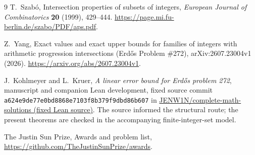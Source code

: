 \documentclass[11pt,a4paper]{article}
\theoremstyle{definition}\newtheorem{definition}[theorem]{Definition}
\begin{document}
\begin{thebibliography}{9}
T.~Szab\'o, Intersection properties of subsets of integers,
\emph{European Journal of Combinatorics} \textbf{20} (1999), 429--444.
\url{https://page.mi.fu-berlin.de/szabo/PDF/aps.pdf}.

Z.~Yang, Exact values and exact upper bounds for families of integers with
arithmetic progression intersections (Erd\H{o}s Problem \#272),
arXiv:2607.23004v1 (2026).
\url{https://arxiv.org/abs/2607.23004v1}.

J.~Kohlmeyer and L.~Kruer, \emph{A linear error bound for Erd\H{o}s problem 272},
manuscript and companion Lean development, fixed source commit
\nolinkurl{a624e9de77e0bd8868e7103f8b379f9dbd86b607} in
\href{https://github.com/JENW1N/complete-math-solutions/blob/a624e9de77e0bd8868e7103f8b379f9dbd86b607/proofs/Erdos272.lean}{JENW1N/complete-math-solutions (fixed Lean source)}.
The source informed the structural route; the present theorems are checked
in the accompanying finite-integer-set model.

The Justin Sun Prize, Awards and problem list,
\url{https://github.com/TheJustinSunPrize/awards}.
\end{thebibliography}
\end{document}
